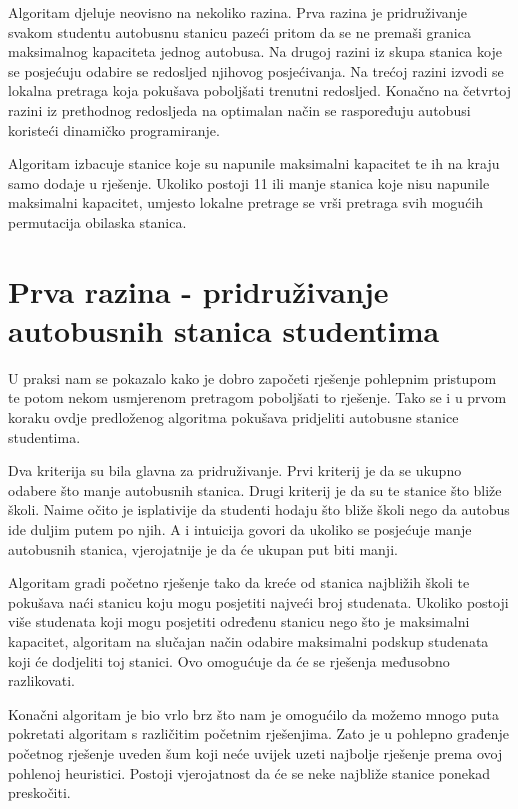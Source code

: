 \documentclass[times, utf8, seminar, numeric]{fer}
\begin{document}
Algoritam djeluje neovisno na nekoliko razina. Prva razina je pridruživanje svakom studentu autobusnu stanicu pazeći pritom da se ne premaši granica maksimalnog kapaciteta jednog autobusa. Na drugoj razini iz skupa stanica koje se posjećuju odabire se redosljed njihovog posjećivanja. Na trećoj razini izvodi se lokalna pretraga koja pokušava poboljšati trenutni redosljed. Konačno na četvrtoj razini iz prethodnog redosljeda na optimalan način se raspoređuju autobusi koristeći dinamičko programiranje.

Algoritam izbacuje stanice koje su napunile maksimalni kapacitet te ih na kraju samo dodaje u rješenje. Ukoliko postoji 11 ili manje stanica koje nisu napunile maksimalni kapacitet, umjesto lokalne pretrage se vrši pretraga svih mogućih permutacija obilaska stanica.

\section{Prva razina - pridruživanje autobusnih stanica studentima}
U praksi nam se pokazalo kako je dobro započeti rješenje pohlepnim pristupom te potom nekom usmjerenom pretragom poboljšati to rješenje. Tako se i u prvom koraku ovdje predloženog algoritma pokušava pridjeliti autobusne stanice studentima.

Dva kriterija su bila glavna za pridruživanje. Prvi kriterij je da se ukupno odabere što manje autobusnih stanica. Drugi kriterij je da su te stanice što bliže školi. Naime očito je isplativije da studenti hodaju što bliže školi nego da autobus ide duljim putem po njih. A i intuicija govori da ukoliko se posjećuje manje autobusnih stanica, vjerojatnije je da će ukupan put biti manji.

Algoritam gradi početno rješenje tako da kreće od stanica najbližih školi te pokušava naći stanicu koju mogu posjetiti najveći broj studenata. Ukoliko postoji više studenata koji mogu posjetiti određenu stanicu nego što je maksimalni kapacitet, algoritam na slučajan način odabire maksimalni podskup studenata koji će dodjeliti toj stanici. Ovo omogućuje da će se rješenja međusobno razlikovati.

Konačni algoritam je bio vrlo brz što nam je omogućilo da možemo mnogo puta pokretati algoritam s različitim početnim rješenjima. Zato je u pohlepno građenje početnog rješenje uveden šum koji neće uvijek uzeti najbolje rješenje prema ovoj pohlenoj heuristici. Postoji vjerojatnost da će se neke najbliže stanice ponekad preskočiti.
\end{document}
